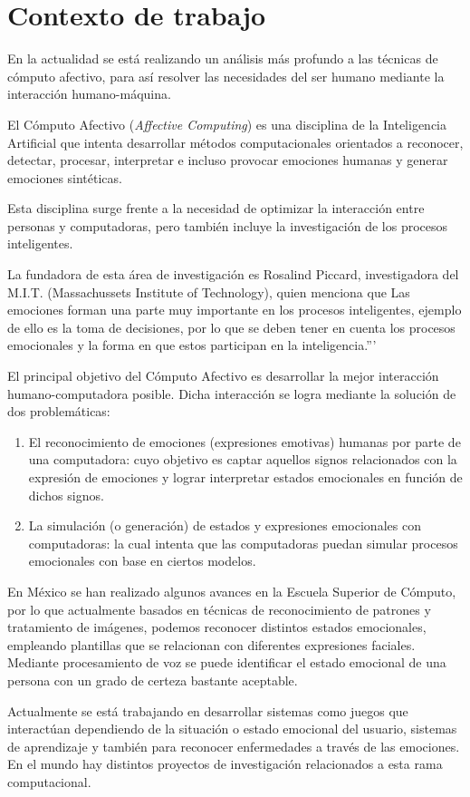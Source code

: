 \section{Contexto de trabajo}
\noindent En la actualidad se está realizando un análisis más profundo a las técnicas de cómputo afectivo, para así resolver las necesidades del ser humano mediante la interacción humano-máquina.
\par
El Cómputo Afectivo (\textit{Affective Computing}) es una disciplina de la Inteligencia Artificial que intenta desarrollar métodos computacionales orientados a reconocer, detectar, procesar, interpretar e incluso provocar emociones humanas y generar emociones sintéticas.
\par
Esta disciplina surge frente a la necesidad de optimizar la interacción entre personas y computadoras, pero también incluye la investigación de los procesos inteligentes.
\par
La fundadora de esta área de investigación es Rosalind Piccard, investigadora del M.I.T. (Massachussets Institute of Technology), quien menciona que Las emociones forman una parte muy importante en los procesos inteligentes, ejemplo de ello es la toma de decisiones, por lo que se deben tener en cuenta los procesos emocionales y la forma en que estos participan en la inteligencia.”'\cite{NOTA}
\par
El principal objetivo del Cómputo Afectivo es desarrollar la mejor interacción humano-computadora posible. Dicha interacción se logra mediante la solución de dos problemáticas:
\begin{enumerate}
\item El reconocimiento de emociones (expresiones emotivas) humanas por parte de 	una computadora: cuyo objetivo es captar aquellos signos relacionados con la expresión de emociones y lograr interpretar estados emocionales en función de dichos signos.
\item La simulación (o generación) de estados y expresiones emocionales con computadoras: la cual intenta que las computadoras puedan simular procesos emocionales con base en ciertos modelos.
\end{enumerate}
\par
En México se han realizado algunos avances en la Escuela Superior de Cómputo, por lo que actualmente basados en técnicas de reconocimiento de patrones y tratamiento de
imágenes, podemos reconocer distintos estados emocionales, empleando plantillas que se relacionan con diferentes expresiones faciales. Mediante procesamiento de voz se puede identificar el estado emocional de una persona con un grado de certeza bastante aceptable.
\par
Actualmente se está trabajando en desarrollar sistemas como juegos que interactúan dependiendo de la situación o estado emocional del usuario, sistemas de aprendizaje y también para reconocer enfermedades a través de las emociones. En el mundo hay distintos proyectos de investigación relacionados a esta rama computacional.
\par